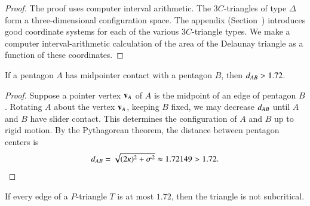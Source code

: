 \begin{proof} The proof uses computer interval arithmetic. The $3C$-triangles of
  type $\Delta$ form a three-dimensional configuration space.  The
  appendix (Section~) introduces good coordinate
  systems for each of the various $3C$-triangle types.  We make a
  computer interval-arithmetic calculation of the area of the Delaunay triangle as a
  function of these coordinates.
\end{proof}

\begin{lemma}  
  If a pentagon $A$ has midpointer contact with a pentagon $B$, then
  $d_{AB} > 1.72$.
\end{lemma}

\begin{proof} Suppose a pointer vertex ${\mathbf v}_A$ of $A$ is the midpoint of an
  edge of pentagon $B$.  Rotating $A$ about the vertex ${\mathbf v}_A$, keeping
  $B$ fixed, we may decrease $d_{AB}$ until $A$ and $B$
  have slider contact.  This determines the configuration of $A$ and
  $B$ up to rigid motion.  By the Pythagorean theorem, the
  distance between pentagon centers is
\[
d_{AB} = \sqrt{(2\kappa)^2 + \sigma^2} \approx 1.72149 > 1.72.
\] %
\end{proof}

\begin{lemma}
  If every edge of a $P$-triangle $T$ is at most $1.72$, then the
  triangle is not subcritical.
\end{lemma}

